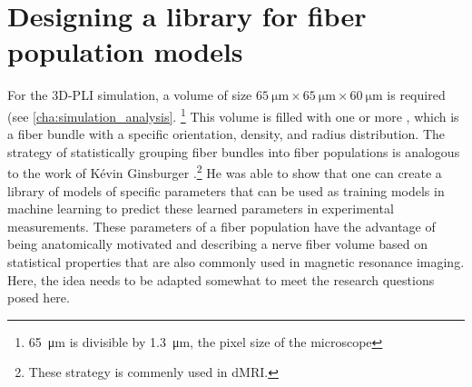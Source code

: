 \section{Designing a library for fiber population models}
%
For the \ac{3D-PLI} simulation, a volume of size $\SI{65}{\micro\meter} \times \SI{65}{\micro\meter} \times \SI{60}{\micro\meter}$ is required (see \cref{cha:simulation_analysis}. \footnote{\SI{65}{\micro\meter} is divisible by \SI{1.3}{\micro\meter}, the pixel size of the microscope}
This volume is filled with one or more , which is a fiber bundle with a specific orientation, density, and radius distribution.
The strategy of statistically grouping fiber bundles into fiber populations is analogous to the work of K{\'{e}}vin Ginsburger \cite{Ginsburger2018,Ginsburger2019,ginsburgerDis2019}.\footnote{These strategy is commenly used in \ac{dMRI}.}
He was able to show that one can create a library of models of specific parameters that can be used as training models in machine learning to predict these learned parameters in experimental measurements.
These parameters of a fiber population have the advantage of being anatomically motivated and describing a nerve fiber volume based on statistical properties that are also commonly used in magnetic resonance imaging.
Here, the idea needs to be adapted somewhat to meet the research questions posed here.
%
% 
% 
